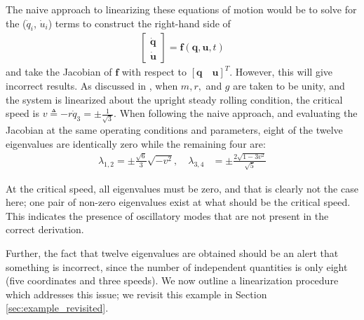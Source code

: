 \documentclass[smallcondensed,final]{svjour3}                     %
\begin{document}
The naive approach to linearizing these equations of motion would be to solve
for the ($\dot{q}_i$, $\dot{u}_i$) terms to construct the right-hand side of
\begin{align}
\begin{bmatrix}\dot{\mathbf{q}} \\ \dot{\mathbf{u}}\end{bmatrix} =
    \mathbf{f}(\mathbf{q}, \mathbf{u}, t)
\end{align}
and take the Jacobian of $\mathbf{f}$ with respect to $[\mathbf{q} \quad
\mathbf{u}]^T$. However, this will give incorrect results. As discussed in
\cite{Schwab2003}, when $m, r,$ and $g$ are taken to be unity, and the system
is linearized about the upright steady rolling condition, the critical speed is
$v \triangleq -r\dot{q}_3 =\pm\frac{1}{\sqrt{3}}$. When following the naive approach, and
evaluating the Jacobian at the same operating conditions and parameters, eight
of the twelve eigenvalues are identically zero while the remaining four are:
\begin{align}
  \label{eq:evals_incorrect}
  \lambda_{1,2}=\pm\frac{\sqrt{6}}{3}\sqrt{-v^2},
  \quad \lambda_{3,4} &= \pm \frac{2\sqrt{1 - 3v^2}}{\sqrt{5}}
\end{align}

At the critical speed, all eigenvalues must be zero, and that is clearly not
the case here; one pair of non-zero eigenvalues exist at what should be the
critical speed. This indicates the presence of oscillatory modes that are not
present in the correct derivation.

Further, the fact that twelve eigenvalues are obtained should be an alert that
something is incorrect, since the number of independent quantities is only
eight (five coordinates and three speeds). We now outline a linearization
procedure which addresses this issue; we revisit this example in Section
\ref{sec:example_revisited}.
\end{document}
